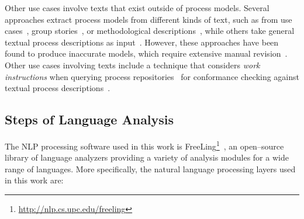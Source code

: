 Other use cases involve texts that exist outside of process models. Several
approaches extract process models from different kinds of text, such as from use
cases~\cite{sinha2010use}, group stories~\cite{gonccalves2009business}, or
methodological descriptions~\cite{epure2015automatic},  while others take
general textual process descriptions as
input~\cite{ghose2007process,friedrich2011process}. However,  these approaches
have been found to produce inaccurate models, which require extensive manual
revision~\cite{selway2015formalising}. Other use cases involving texts include a
technique that considers \textit{work instructions} when querying process
repositories~\cite{leopold2017searching} for conformance checking against
textual process descriptions~\cite{vanderaa2018checking}.


\subsection{Steps of Language Analysis}

 The NLP processing software used in this work is
 FreeLing\footnote{\url{http://nlp.cs.upc.edu/freeling}}~\cite{PadroS12}, an
 open--source library of language analyzers providing a variety of analysis
 modules for a wide range of languages. More specifically, the natural language
 processing layers used in this work are:
 
